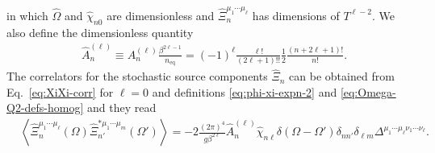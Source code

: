 \documentclass[aps,prd,preprint,nofootinbib,amsmath,amssymb,showpacs,longbibliography,singlecolumn,superscriptaddress,10pt]{revtex4-1}
\theoremstyle{plain}
\theoremstyle{definition}
\begin{document}
%
in which $\widehat{\Omega}$ and $\widehat{\chi}_{n 0}$ are dimensionless and $\widehat{\Xi}_{n}^{\mu_{1} \cdots \mu_{\ell}}$ has dimensions of $T^{\ell-2}$. We also define the dimensionless quantity
%
\begin{equation}
\label{eq:A-adimens-def-homog}
\begin{aligned}
&
\widehat{A}_{n}^{(\ell)} \equiv A_{n}^{(\ell)} \frac{\beta^{2 \ell-1}}{n_{\mathrm{eq}}} = (-1)^{\ell} \frac{\ell !}{(2 \ell + 1)!!}\frac{1}{2}
\frac{(n+2\ell+1)!}{n!}.
\end{aligned}   
\end{equation}
%
The correlators for the stochastic source components $\widehat{\Xi}_{n}$ can be obtained from Eq.~\eqref{eq:XiXi-corr} for $\ell =0$ and definitions \eqref{eq:phi-xi-expn-2} and \eqref{eq:Omega-Q2-defs-homog} and they read
%
\begin{equation}
\begin{aligned}
&
\label{eq:moments-lag-homog-b}
\left\langle \widehat{\Xi}_{n}^{\mu_{1} \cdots \mu_{\ell}}(\Omega) \widehat{\Xi}_{n'}^{*\mu_{1} \cdots \mu_{m}}(\Omega')
\right\rangle
= 
- 2 \frac{(2 \pi)^{4}}{g \beta^{2 \ell}} \widehat{A}_{n}^{(\ell)} \widehat\chi_{n\ell}  \delta(\Omega-\Omega') \delta_{nn'} \delta_{\ell m} \Delta^{\mu_{1} \cdots \mu_{\ell}\nu_{1} \cdots \nu_{\ell}}.
\end{aligned}    
\end{equation}
%
\end{document}

